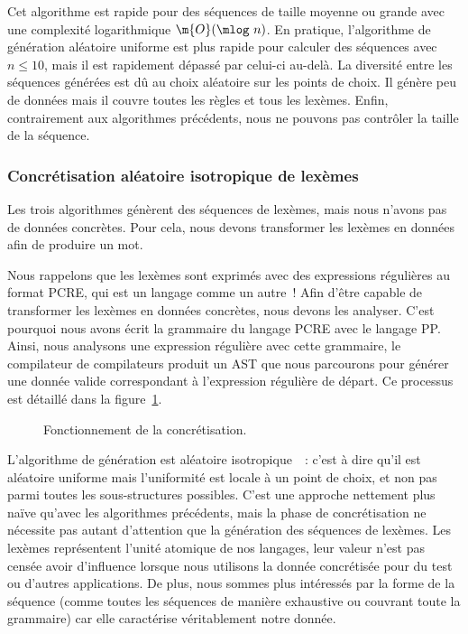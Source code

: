 Cet algorithme est rapide pour des séquences de taille moyenne ou grande avec
une complexité logarithmique $\m{O}(\mlog~n)$. En pratique, l'algorithme de
génération aléatoire uniforme est plus rapide pour calculer des séquences avec
$n \leq 10$, mais il est rapidement dépassé par celui-ci au-delà. La diversité
entre les séquences générées est dû au choix aléatoire sur les points de choix.
Il génère peu de données mais il couvre toutes les règles et tous les lexèmes.
Enfin, contrairement aux algorithmes précédents, nous ne pouvons pas contrôler
la taille de la séquence.

\subsubsection{Concrétisation aléatoire isotropique de lexèmes}
\label{subsection:data:isotropic_generation}

Les trois algorithmes génèrent des séquences de lexèmes, mais nous n'avons pas
de données concrètes. Pour cela, nous devons transformer les lexèmes en données
afin de produire un mot.

Nous rappelons que les lexèmes sont exprimés avec des expressions régulières au
format PCRE, qui est un langage comme un autre~! Afin d'être capable de
transformer les lexèmes en données concrètes, nous devons les analyser. C'est
pourquoi nous avons écrit la grammaire du langage PCRE avec le langage PP.
Ainsi, nous analysons une expression régulière avec cette grammaire, le
compilateur de compilateurs produit un AST que nous parcourons pour générer une
donnée valide correspondant à l'expression régulière de départ. Ce processus est
détaillé dans la figure~\ref{figure:data:regex}.
%
\begin{figure}


\caption{\label{figure:data:regex} Fonctionnement de la concrétisation.}

\end{figure}
%
L'algorithme de génération est aléatoire isotropique~~: c'est à
dire qu'il est aléatoire uniforme mais l'uniformité est locale à un point de
choix, et non pas parmi toutes les sous-structures possibles. C'est une approche
nettement plus naïve qu'avec les algorithmes précédents, mais la phase de
concrétisation ne nécessite pas autant d'attention que la génération des
séquences de lexèmes. Les lexèmes représentent l'unité atomique de nos langages,
leur valeur n'est pas censée avoir d'influence lorsque nous utilisons la donnée
concrétisée pour du test ou d'autres applications. De plus, nous sommes plus
intéressés par la forme de la séquence (comme toutes les séquences de manière
exhaustive ou couvrant toute la grammaire) car elle caractérise véritablement
notre donnée.

